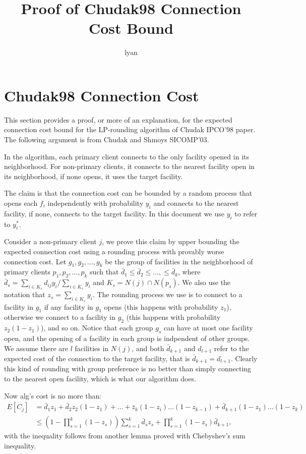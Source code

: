 \documentclass{article}
\title{Proof of Chudak98 Connection Cost Bound}
\author{lyan}
\begin{document}
\maketitle
\section{Chudak98 Connection Cost}
This section provides a proof, or more of an explanation, for the
expected connection cost bound for the LP-rounding algorithm of Chudak
IPCO'98 paper. The following argument is from Chudak and Shmoys
SICOMP'03.

In the algorithm, each primary client connects to the only facility
opened in its neighborhood. For non-primary clients, it connects to
the nearest facility open in its neighborhood, if none opens, it uses
the target facility.

The claim is that the connection cost can be bounded by a random
process that opens each $f_i$ independently with probability $y_i$ and
connects to the nearest facility, if none, connects to the target
facility. In this document we use $y_i$ to refer to $y_i^\ast$.

Consider a non-primary client $j$, we prove this claim by upper
bounding the expected connection cost using a rounding process with
provably worse connection cost. Let $g_1, g_2, \ldots, g_k$ be the
group of facilities in the neighborhood of primary clients $p_1, p_2,
\ldots, p_k$ such that $\bar d_1 \leq \bar d_2 \leq \ldots, \leq \bar
d_k$, where $\bar d_s = \sum_{i \in K_s} d_{ij} y_{i} / \sum_{i \in
  K_s} y_i$ and $K_s = N(j) \cap N(p_s)$. We also use the notation
that $z_s = \sum_{i\in K_s} y_i$. The rounding process we use is to
connect to a facility in $g_1$ if any facility in $g_1$ opens (this
happens with probability $z_1$), otherwise we connect to a facility in
$g_2$ (this happens with probability $z_2(1-z_1)$), and so on. Notice
that each group $g_s$ can have at most one facility open, and the
opening of a facility in each group is indpendent of other groups. We
assume there are $l$ facilities in $N(j)$, and both $\bar d_{k+1}$ and
$d_{l+1}$ refer to the expected cost of the connection to the target
facility, that is $\bar d_{k+1} = d_{l+1}$. Clearly this kind of
rounding with group preference is no better than simply connecting to
the nearest open facility, which is what our algorithm does.

Now alg's cost is no more than:
\begin{align*}
  E[C_j] &= \bar d_1 z_1 + \bar d_2 z_2 (1-z_1) + \ldots + \bar z_k
  (1-z_i)\ldots(1-z_{k-1}) + \bar d_{k+1} (1-z_1) \ldots (1-z_k)\\
  &\leq (1 - \prod_{s=1}^k (1-z_s)) \sum_{s=1}^k \bar d_s z_s +
  \prod_{s=1}^k (1-z_s) \bar d_{k+1},
\end{align*}
with the inequality follows from another lemma proved with Chebyshev's
sum inequality.
\end{document}
